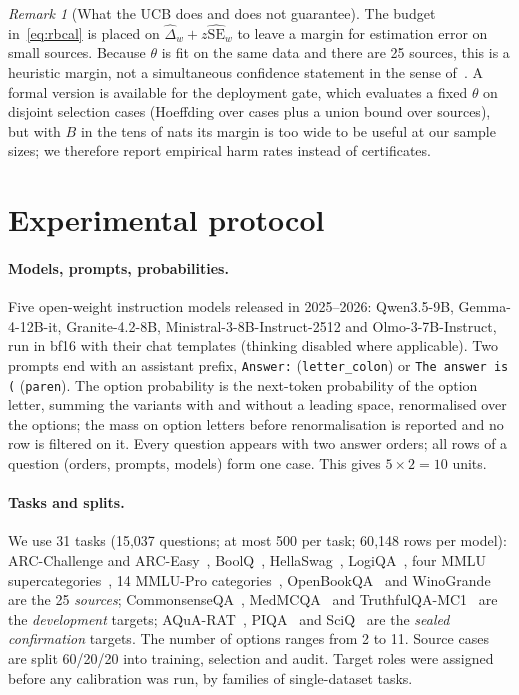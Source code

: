\documentclass[11pt]{article}
\theoremstyle{remark}
\newtheorem{remark}{Remark}
\begin{document}
\begin{remark}[What the UCB does and does not guarantee]\label{rem:ucb}
The budget in~\eqref{eq:rbcal} is placed on $\hat\Delta_w+z\widehat{\mathrm{SE}}_w$ to leave a margin for estimation error on small sources.
Because $\theta$ is fit on the same data and there are 25 sources, this is a heuristic margin, not a simultaneous confidence statement in the sense of~\citep{thomas2019seldonian,angelopoulos2021ltt}.
A formal version is available for the deployment gate, which evaluates a fixed $\theta$ on disjoint selection cases (Hoeffding over cases plus a union bound over sources), but with $B$ in the tens of nats its margin is too wide to be useful at our sample sizes; we therefore report empirical harm rates instead of certificates.
\end{remark}

\section{Experimental protocol}\label{sec:protocol}
\paragraph{Models, prompts, probabilities.}
Five open-weight instruction models released in 2025--2026: Qwen3.5-9B, Gemma-4-12B-it, Granite-4.2-8B, Ministral-3-8B-Instruct-2512 and Olmo-3-7B-Instruct, run in bf16 with their chat templates (thinking disabled where applicable).
Two prompts end with an assistant prefix, \texttt{Answer:} (\texttt{letter\_colon}) or \texttt{The answer is (} (\texttt{paren}).
The option probability is the next-token probability of the option letter, summing the variants with and without a leading space, renormalised over the options; the mass on option letters before renormalisation is reported and no row is filtered on it.
Every question appears with two answer orders; all rows of a question (orders, prompts, models) form one case.
This gives $5\times2=10$ units.

\paragraph{Tasks and splits.}
We use 31 tasks (15{,}037 questions; at most 500 per task; 60{,}148 rows per model): ARC-Challenge and ARC-Easy~\citep{clark2018arc}, BoolQ~\citep{clark2019boolq}, HellaSwag~\citep{zellers2019hellaswag}, LogiQA~\citep{liu2020logiqa}, four MMLU supercategories~\citep{hendrycks2021mmlu}, 14 MMLU-Pro categories~\citep{wang2024mmlupro}, OpenBookQA~\citep{mihaylov2018obqa} and WinoGrande~\citep{sakaguchi2020winogrande} are the 25 \emph{sources}; CommonsenseQA~\citep{talmor2019csqa}, MedMCQA~\citep{pal2022medmcqa} and TruthfulQA-MC1~\citep{lin2022truthfulqa} are the \emph{development} targets; AQuA-RAT~\citep{ling2017aqua}, PIQA~\citep{bisk2020piqa} and SciQ~\citep{welbl2017sciq} are the \emph{sealed confirmation} targets.
The number of options ranges from 2 to 11.
Source cases are split 60/20/20 into training, selection and audit.
Target roles were assigned before any calibration was run, by families of single-dataset tasks.
\end{document}
